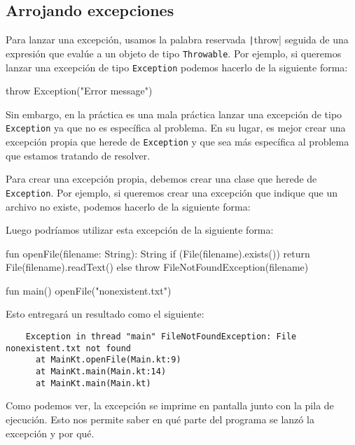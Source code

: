 \subsection{Arrojando excepciones}
  Para lanzar una excepción, usamos la palabra reservada \texttt|throw| seguida de
  una expresión que evalúe a un objeto de tipo \texttt{Throwable}.
  Por ejemplo, si queremos lanzar una excepción de tipo \texttt{Exception} podemos hacerlo de la
  siguiente forma:

  \begin{kotlin}
    throw Exception("Error message")
  \end{kotlin}

  Sin embargo, en la práctica es una mala práctica lanzar una excepción de tipo \texttt{Exception}
  ya que no es específica al problema.
  En su lugar, es mejor crear una excepción propia que herede de \texttt{Exception} y que sea
  más específica al problema que estamos tratando de resolver.

  Para crear una excepción propia, debemos crear una clase que herede de \texttt{Exception}.
  Por ejemplo, si queremos crear una excepción que indique que un archivo no existe, podemos
  hacerlo de la siguiente forma:


  Luego podríamos utilizar esta excepción de la siguiente forma:

  \begin{kotlin}
    fun openFile(filename: String): String {
      if (File(filename).exists()) {
        return File(filename).readText()
      } else {
        throw FileNotFoundException(filename)
      }
    }

    fun main() {
      openFile("nonexistent.txt")
    }
  \end{kotlin}

  Esto entregará un resultado como el siguiente:

  \begin{verbatim}
    Exception in thread "main" FileNotFoundException: File nonexistent.txt not found
      at MainKt.openFile(Main.kt:9)
      at MainKt.main(Main.kt:14)
      at MainKt.main(Main.kt)
  \end{verbatim}

  Como podemos ver, la excepción se imprime en pantalla junto con la pila de ejecución.
  Esto nos permite saber en qué parte del programa se lanzó la excepción y por qué.

